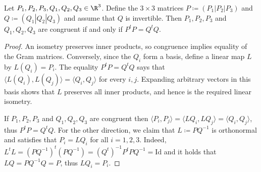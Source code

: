 \begin{lemma} \label{lem:congruent}
\leanok
{}
    Let $P_1,P_2,P_3, Q_1,Q_2,Q_3 \in \R^3$. Define the $3 \times 3$ matrices $P \coloneqq (P_1|P_2|P_3)$ and $Q \coloneqq (Q_1|Q_2|Q_3)$ and assume that $Q$ is invertible.
    Then $P_1, P_2, P_3$ and $Q_1, Q_2, Q_3$ are congruent if and only if $P^t P = Q^t Q$.
\end{lemma}

\begin{proof}
\leanok
An isometry preserves inner products, so congruence implies equality of the Gram matrices.
Conversely, since the $Q_i$ form a basis, define a linear map $L$ by $L(Q_i)=P_i$.
The equality $P^t P = Q^t Q$ says that
$\langle L(Q_i),L(Q_j)\rangle=\langle Q_i,Q_j\rangle$ for every $i,j$.
Expanding arbitrary vectors in this basis shows that $L$ preserves all inner products,
and hence is the required linear isometry.

    If $P_1, P_2, P_3$ and $Q_1, Q_2, Q_3$ are congruent then $\langle P_i,P_j\rangle = \langle LQ_i,LQ_j\rangle = \langle Q_i,Q_j\rangle$, thus $P^t P = Q^t Q$.
    For the other direction, we claim that $L \coloneqq PQ^{-1}$ is orthonormal and satisfies that $P_i = LQ_i$ for all $i=1,2,3$.
    Indeed,  $L^t L = (PQ^{-1})^t (PQ^{-1}) = (Q^t)^{-1} P^t P Q^{-1} = \mathrm{Id}$ and it holds that $LQ=PQ^{-1}Q=P$, thus $LQ_i = P_i$.
\end{proof}


